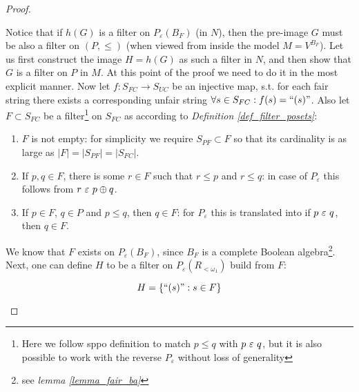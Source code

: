 \begin{proof}
\begin{enumerate}
\begin{enumerate}
\begin{enumerate}[label=(\roman*)]
                Notice that if $h(G)$ is a filter on $P_\varepsilon(B_F)$ (in $N$), then the pre-image $G$ must be also a filter on $(P, \leq)$ (when viewed from inside the model $M = V^{B_F}$). Let us first construct the image $H = h(G)$ as such a filter in $N$, and then show that $G$ is a filter on $P$ in $M$. At this point of the proof we need to do it in the most explicit manner. Now let $f: S_{FC} \to S_{UC}$ be an injective map, s.t. for each fair string there exists a corresponding unfair string $\forall s \in  S_{FC}: f(s) = \text{``} (s) \text{''}$. Also let $F \subset S_{FC}$ be a filter\footnote{Here we follow sppo definition to match $p \leq q$ with $p \ \varepsilon\  q$, but it is also possible to work with the reverse $P_\varepsilon$ without loss of generality} on $S_{FC}$ as according to \textit{Definition \ref{def_filter_posets}}:

                \begin{enumerate}
                    \item $F$ is not empty: for simplicity we require $S_{PF} \subset F$ so that its cardinality is as large as $|F| = |S_{PF}| = |S_{FC}|$.
                    \item If $p,q \in F$, there is some $r \in F$ such that $r \leq p$ and $r \leq q$: in case of $P_\varepsilon$ this follows from $r \ \varepsilon\  p \oplus q$.
                    \item If $p \in F$, $q \in P$ and $p \leq q$, then $q \in F$: for $P_\varepsilon$ this is translated into if $p \ \varepsilon\  q$, then $q \in F$.
                \end{enumerate}
                
                We know that $F$ exists on $P_\varepsilon(B_F)$, since $B_F$ is a complete Boolean algebra\footnote{see \textit{lemma \ref{lemma_fair_ba}}}. Next, one can define $H$ to be a filter on $P_\varepsilon(R_{<\omega_1})$ build from $F$:

                    \[ H = \{ \text{``} (s) \text{''} : s \in F \} \]


\end{enumerate}
\end{enumerate}
\end{enumerate}
\end{proof}
